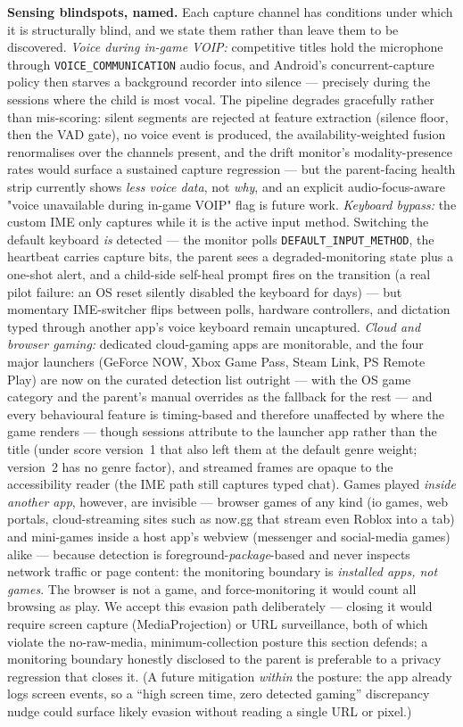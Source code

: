 \documentclass[11pt,a4paper]{article}
\begin{document}
\textbf{Sensing blindspots, named.} Each capture channel has conditions under
which it is structurally blind, and we state them rather than leave them to be
discovered. \emph{Voice during in-game VOIP:} competitive titles hold the
microphone through \texttt{VOICE\_COMMUNICATION} audio focus, and Android's
concurrent-capture policy then starves a background recorder into silence ---
precisely during the sessions where the child is most vocal. The pipeline
degrades gracefully rather than mis-scoring: silent segments are rejected at
feature extraction (silence floor, then the VAD gate), no voice event is
produced, the availability-weighted fusion renormalises over the channels
present, and the drift monitor's modality-presence rates would surface a
sustained capture regression --- but the parent-facing health strip currently
shows \emph{less voice data}, not \emph{why}, and an explicit
audio-focus-aware "voice unavailable during in-game VOIP" flag is future work.
\emph{Keyboard bypass:} the custom IME only captures while it is the active
input method. Switching the default keyboard \emph{is} detected --- the
monitor polls \texttt{DEFAULT\_INPUT\_METHOD}, the heartbeat carries capture
bits, the parent sees a degraded-monitoring state plus a one-shot alert, and a
child-side self-heal prompt fires on the transition (a real pilot failure: an
OS reset silently disabled the keyboard for days) --- but momentary
IME-switcher flips between polls, hardware controllers, and dictation typed
through another app's voice keyboard remain uncaptured. \emph{Cloud and
browser gaming:} dedicated cloud-gaming apps are monitorable, and the four
major launchers (GeForce NOW, Xbox Game Pass, Steam Link, PS Remote Play) are
now on the curated detection list outright --- with the OS game category and
the parent's manual overrides as the fallback for the rest --- and every
behavioural feature is timing-based and therefore unaffected by where the game
renders --- though sessions attribute to the launcher app rather than the
title (under score version~1 that also left them at the default genre weight;
version~2 has no genre factor), and streamed frames are opaque to the
accessibility reader (the IME
path still captures typed chat). Games played \emph{inside another app},
however, are invisible --- browser games of any kind (io games, web portals,
cloud-streaming sites such as now.gg that stream even Roblox into a tab) and
mini-games inside a host app's webview (messenger and social-media games)
alike --- because detection is foreground-\emph{package}-based and never
inspects network traffic or page content: the monitoring boundary is
\emph{installed apps, not games}. The browser is not a game, and
force-monitoring it would count all browsing as play. We accept this evasion
path deliberately --- closing it would require screen capture
(MediaProjection) or URL surveillance, both of which violate the no-raw-media,
minimum-collection posture this section defends; a monitoring boundary
honestly disclosed to the parent is preferable to a privacy regression that
closes it. (A future mitigation \emph{within} the posture: the app already
logs screen events, so a ``high screen time, zero detected gaming''
discrepancy nudge could surface likely evasion without reading a single URL
or pixel.)
\end{document}
